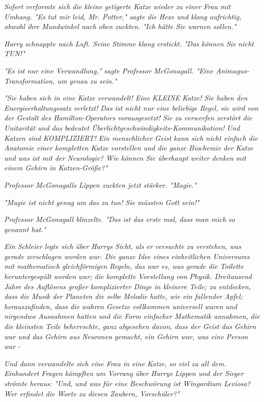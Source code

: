 {\emph{Sofort verformte sich die kleine getigerte Katze wieder zu einer Frau mit Umhang. "Es tut mir leid, Mr. Potter," sagte die Hexe und klang aufrichtig, obwohl ihre Mundwinkel nach oben zuckten. "Ich hätte Sie warnen sollen."}

\emph{Harry schnappte nach Luft. Seine Stimme klang erstickt.} \emph{\emph{"Das können Sie nicht TUN!"}}

\emph{"Es ist nur eine Verwandlung," sagte Professor McGonagall. "Eine Animagus-Transformation, um genau zu sein."}

\emph{"Sie haben sich in eine Katze verwandelt! Eine} \emph{\emph{KLEINE}} \emph{Katze! Sie haben den Energieerhaltungssatz verletzt!} \emph{Das ist nicht nur eine beliebige Regel, sie wird von der Gestalt des Hamilton-Operators vorausgesetzt! Sie zu verwerfen zerstört die Unitarität und das bedeutet Überlichtgeschwindigkeits-Kommunikation!} \emph{Und Katzen sind} \emph{\emph{KOMPLIZIERT!}} \emph{Ein menschlicher Geist kann sich nicht einfach die Anatomie einer kompletten Katze vorstellen und die ganze Biochemie der Katze und was ist mit der} \emph{\emph{Neurologie?}} \emph{Wie können Sie überhaupt weiter} \emph{\emph{denken}} \emph{mit einem Gehirn in Katzen-Größe?"}

\emph{Professor McGonagalls Lippen zuckten jetzt stärker. "Magie."}

\emph{"Magie} \emph{\emph{ist nicht genug}} \emph{um das zu tun! Sie müssten Gott sein!"}

\emph{Professor McGonagall blinzelte. "Das ist das erste mal, dass man mich} \emph{\emph{so}} \emph{genannt hat."}

\emph{Ein Schleier legte sich über Harrys Sicht, als er versuchte zu verstehen, was gerade zerschlagen worden war. Die ganze Idee eines einheitlichen Universums mit} \emph{mathematisch gleichförmigen Regeln, das war es, was gerade die Toilette heruntergespült worden war; die komplette Vorstellung von} \emph{\emph{Physik}. Dreitausend Jahre des Auflösens großer komplizierter Dinge in kleinere Teile; zu entdecken, dass die Musik der Planeten die selbe Melodie hatte, wie ein fallender Apfel; herauszufinden, dass die wahren Gesetze vollkommen universell waren und nirgendwo Ausnahmen hatten und die Form einfacher Mathematik annahmen, die die kleinsten Teile beherrschte,} \emph{\emph{ganz abgesehen davon}, dass der Geist das Gehirn war und das Gehirn aus Neuronen gemacht, ein Gehirn war, was eine Person} \emph{\emph{war}} \emph{-}

\emph{Und dann verwandelte sich eine Frau in eine Katze, so viel zu all dem.}\\ \emph{Einhundert Fragen kämpften} \emph{um Vorrang über Harrys Lippen und der Sieger strömte heraus: "Und, und was für eine Beschwörung ist} \emph{\emph{Wingardium Leviosa?}} \emph{Wer erfindet die Worte zu diesen Zaubern, Vorschüler?"}

}
